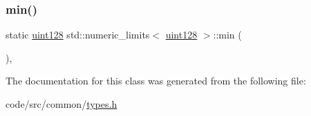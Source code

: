 \subsubsection{\texorpdfstring{min()}{min()}}
{\footnotesize\ttfamily static \hyperlink{classuint128}{uint128} std\+::numeric\+\_\+limits$<$ \hyperlink{classuint128}{uint128} $>$\+::min (\begin{DoxyParamCaption}{ }\end{DoxyParamCaption})\hspace{0.3cm}{\ttfamily [inline]}, {\ttfamily [static]}}



The documentation for this class was generated from the following file\+:\begin{DoxyCompactItemize}
\item 
code/src/common/\hyperlink{types_8h}{types.\+h}\end{DoxyCompactItemize}
